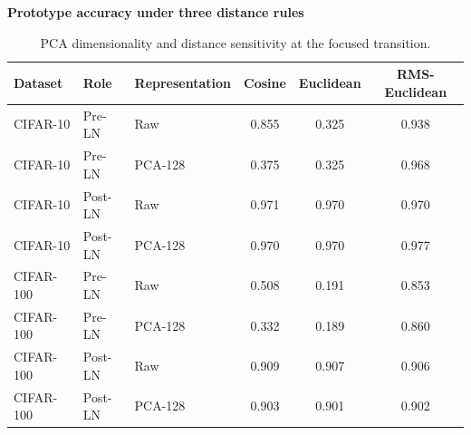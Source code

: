 \begin{table}[!htbp]
\centering
\begin{threeparttable}
\caption{PCA dimensionality and distance sensitivity at the focused transition.}
\label{tab:pca-dimensionality-main}
\footnotesize
\setlength{\tabcolsep}{4pt}
\renewcommand{\arraystretch}{1.04}
{\normalsize\bfseries Prototype accuracy under three distance rules\par}
\vspace{3pt}
\begin{tabularx}{\linewidth}{@{}l l l c c c@{}}
\toprule
Dataset & Role & Representation & Cosine & Euclidean & RMS-Euclidean\\
\midrule
CIFAR-10 & Pre-LN & Raw & 0.855 & 0.325 & 0.938\\
\thinrowrule
CIFAR-10 & Pre-LN & PCA-128 & 0.375 & 0.325 & 0.968\\
\thinrowrule
CIFAR-10 & Post-LN & Raw & 0.971 & 0.970 & 0.970\\
\thinrowrule
CIFAR-10 & Post-LN & PCA-128 & 0.970 & 0.970 & 0.977\\
\midrule
CIFAR-100 & Pre-LN & Raw & 0.508 & 0.191 & 0.853\\
\thinrowrule
CIFAR-100 & Pre-LN & PCA-128 & 0.332 & 0.189 & 0.860\\
\thinrowrule
CIFAR-100 & Post-LN & Raw & 0.909 & 0.907 & 0.906\\
\thinrowrule
CIFAR-100 & Post-LN & PCA-128 & 0.903 & 0.901 & 0.902\\
\bottomrule
\end{tabularx}


\end{threeparttable}
\end{table}
